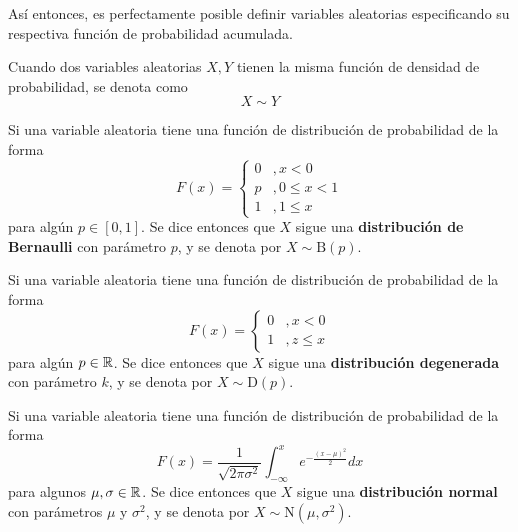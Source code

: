 Así entonces, es perfectamente posible definir variables aleatorias especificando su respectiva función de probabilidad acumulada.

Cuando dos variables aleatorias $X, Y$ tienen la misma función de densidad de probabilidad, se denota como
\begin{equation}
X \sim Y
\end{equation}

\begin{ejemplo}
Si una variable aleatoria tiene una función de distribución de probabilidad de la forma
\begin{equation}
F(x) = \begin{cases}
0 &, x < 0 \\
p &, 0 \leq x < 1 \\
1 &, 1 \leq x
\end{cases}
\end{equation}
para algún $p \in [0,1]$. Se dice entonces que $X$ sigue una \textbf{distribución de Bernaulli} con parámetro $p$, y se denota por $X\sim \text{B}(p)$.
\end{ejemplo}

\begin{ejemplo}
Si una variable aleatoria tiene una función de distribución de probabilidad de la forma
\begin{equation}
F(x) = \begin{cases}
0 &, x < 0 \\
1 &, z \leq x
\end{cases}
\end{equation}
para algún $p \in \mathbb{R}$. Se dice entonces que $X$ sigue una \textbf{distribución degenerada} con parámetro $k$, y se denota por $X\sim \text{D}(p)$.
\end{ejemplo}

\begin{ejemplo}
Si una variable aleatoria tiene una función de distribución de probabilidad de la forma
\begin{equation}
F(x) = \frac{1}{\sqrt{2 \pi \sigma^{2}}} \int_{-\infty}^{x} e^{-\frac{(x-\mu)^{2}}{2}} dx
\end{equation}
para algunos $\mu, \sigma \in \mathbb{R}$. Se dice entonces que $X$ sigue una \textbf{distribución normal} con parámetros $\mu$ y $\sigma^{2}$, y se denota por $X\sim \text{N}(\mu,\sigma^{2})$.
\end{ejemplo}

